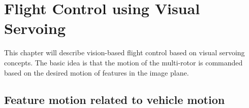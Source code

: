 
\chapter{Flight Control using Visual Servoing}
\label{chap:visual_servoing}

This chapter will describe vision-based flight control based on visual servoing concepts.  The basic idea is that the motion of the multi-rotor is commanded based on the desired motion of features in the image plane.  


\section{Feature motion related to vehicle motion}

